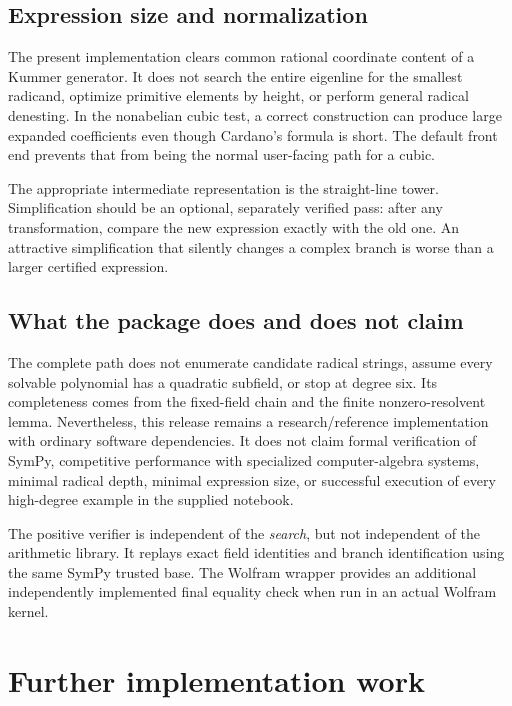 \documentclass[11pt,a4paper]{article}
\theoremstyle{definition}
\theoremstyle{remark}
\begin{document}
\subsection{Expression size and normalization}

The present implementation clears common rational coordinate content of a Kummer generator. It does not search the entire eigenline for the smallest radicand, optimize primitive elements by height, or perform general radical denesting. In the nonabelian cubic test, a correct construction can produce large expanded coefficients even though Cardano's formula is short. The default front end prevents that from being the normal user-facing path for a cubic.

The appropriate intermediate representation is the straight-line tower. Simplification should be an optional, separately verified pass: after any transformation, compare the new expression exactly with the old one. An attractive simplification that silently changes a complex branch is worse than a larger certified expression.

\subsection{What the package does and does not claim}

The complete path does not enumerate candidate radical strings, assume every solvable polynomial has a quadratic subfield, or stop at degree six. Its completeness comes from the fixed-field chain and the finite nonzero-resolvent lemma. Nevertheless, this release remains a research/reference implementation with ordinary software dependencies. It does not claim formal verification of SymPy, competitive performance with specialized computer-algebra systems, minimal radical depth, minimal expression size, or successful execution of every high-degree example in the supplied notebook.

The positive verifier is independent of the \emph{search}, but not independent of the arithmetic library. It replays exact field identities and branch identification using the same SymPy trusted base. The Wolfram wrapper provides an additional independently implemented final equality check when run in an actual Wolfram kernel.

\section{Further implementation work}
\end{document}
